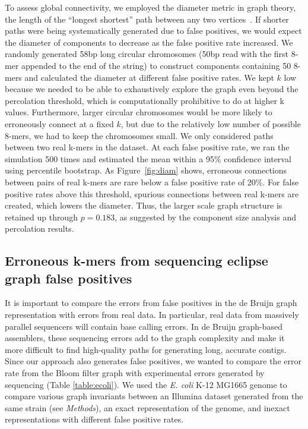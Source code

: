 \documentclass{pnastwo}
\begin{document}
\begin{article}
To assess global connectivity, we employed the diameter metric in
graph theory, the length of the ``longest shortest'' path between any
two vertices~\cite{bondy2008graph}.  If shorter paths were being
systematically generated due to false positives, we would expect the
diameter of components to decrease as the false positive rate
increased.  We randomly generated 58bp long circular chromosomes (50bp
read with the first 8-mer appended to the end of the string) to
construct components containing 50 8-mers and calculated the diameter
at different false positive rates. We kept $k$ low because we needed
to be able to exhaustively explore the graph even beyond the
percolation threshold, which is computationally prohibitive to do at
higher k values. Furthermore, larger circular chromosomes would be
more likely to erroneously connect at a fixed $k$, but due to the
relatively low number of possible 8-mers, we had to keep the
chromosomes small.  We only considered paths between two real k-mers
in the dataset.  At each false positive rate, we ran the simulation
500 times and estimated the mean within a 95\% confidence interval
using percentile bootstrap. As Figure~\ref{fig:diam} shows, erroneous
connections between pairs of real k-mers are rare below a false
positive rate of 20\%.  For false positive rates above this threshold,
spurious connections between real k-mers are created, which lowers the
diameter.  Thus, the larger scale graph structure is retained up
through $p = 0.183$, as suggested by the component size analysis and
percolation results.

\subsection{Erroneous k-mers from sequencing eclipse graph false positives}


It is important to compare the errors from false positives in the de
Bruijn graph representation with errors from real data.  In
particular, real data from massively parallel sequencers will contain
base calling errors.  In de Bruijn graph-based assemblers, these
sequencing errors add to the graph complexity and make it more
difficult to find high-quality paths for generating long, accurate
contigs. Since our approach also generates false positives, we wanted
to compare the error rate from the Bloom filter graph with
experimental errors generated by sequencing (Table
\ref{table:ecoli}). We used the \emph{E. coli} K-12 MG1665 genome to
compare various graph invariants between an Illumina dataset generated
from the same strain (see \emph{Methods}), an exact representation of
the genome, and inexact representations with different false positive
rates.


\end{article}
\end{document}
